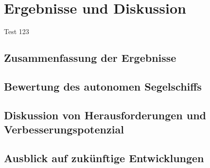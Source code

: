 

\chapter{Ergebnisse und Diskussion }
\label{chap:diskussion}
Test 123

\section{Zusammenfassung der Ergebnisse}
\section{Bewertung des autonomen Segelschiffs}
\section{Diskussion von Herausforderungen und Verbesserungspotenzial}
\section{Ausblick auf zukünftige Entwicklungen}
